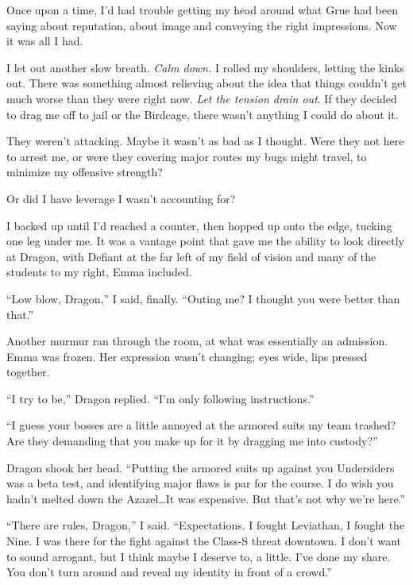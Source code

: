 Once upon a time, I'd had trouble getting my head around what Grue had been saying about reputation, about image and conveying the right impressions.  Now it was all I had.



I let out another slow breath.  \emph{Calm down.  }I rolled my shoulders, letting the kinks out.  There was something almost relieving about the idea that things couldn't get much worse than they were right now.  \emph{Let the tension drain out}.  If they decided to drag me off to jail or the Birdcage, there wasn't anything I could do about it.



They weren't attacking.  Maybe it wasn't as bad as I thought.  Were they not here to arrest me, or were they covering major routes my bugs might travel, to minimize my offensive strength?



Or did I have leverage I wasn't accounting for?



I backed up until I'd reached a counter, then hopped up onto the edge, tucking one leg under me.  It was a vantage point that gave me the ability to look directly at Dragon, with Defiant at the far left of my field of vision and many of the students to my right, Emma included.



``Low blow, Dragon,'' I said, finally.  ``Outing me?  I thought you were better than that.''



Another murmur ran through the room, at what was essentially an admission.  Emma was frozen.  Her expression wasn't changing; eyes wide, lips pressed together.



``I try to be,'' Dragon replied.  ``I'm only following instructions.''



``I guess your bosses are a little annoyed at the armored suits my team trashed?  Are they demanding that you make up for it by dragging me into custody?''



Dragon shook her head.  ``Putting the armored suits up against you Undersiders was a beta test, and identifying major flaws is par for the course.  I do wish you hadn't melted down the Azazel\ldots It was expensive.  But that's not why we're here.''



``There are rules, Dragon,'' I said.  ``Expectations.  I fought Leviathan, I fought the Nine.  I was there for the fight against the Class-S threat downtown.  I don't want to sound arrogant, but I think maybe I deserve to, a little.  I've done my share.  You don't turn around and reveal my identity in front of a crowd.''



